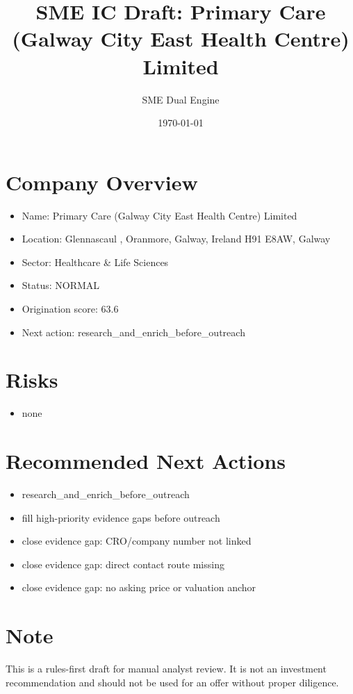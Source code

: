 \documentclass[11pt,a4paper]{article}
\title{SME IC Draft: Primary Care (Galway City East Health Centre) Limited}
\author{SME Dual Engine}
\date{\today}
\begin{document}
\maketitle
\section*{Company Overview}
\begin{itemize}[leftmargin=1.4em]
\item Name: Primary Care (Galway City East Health Centre) Limited
\item Location: Glennascaul , Oranmore, Galway, Ireland H91 E8AW, Galway
\item Sector: Healthcare \& Life Sciences
\item Status: NORMAL
\item Origination score: 63.6
\item Next action: research\_and\_enrich\_before\_outreach
\end{itemize}
\section*{Risks}
\begin{itemize}[leftmargin=1.4em]
\item none
\end{itemize}
\section*{Recommended Next Actions}
\begin{itemize}[leftmargin=1.4em]
\item research\_and\_enrich\_before\_outreach
\item fill high-priority evidence gaps before outreach
\item close evidence gap: CRO/company number not linked
\item close evidence gap: direct contact route missing
\item close evidence gap: no asking price or valuation anchor
\end{itemize}
\section*{Note}
This is a rules-first draft for manual analyst review. It is not an investment
recommendation and should not be used for an offer without proper diligence.
\end{document}
